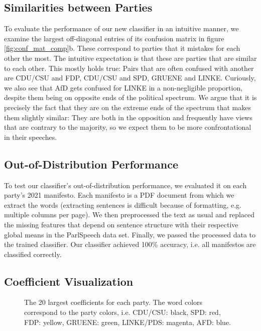 \documentclass{article}
\begin{document}
\subsection{Similarities between Parties}
To evaluate the performance of our new classifier in an intuitive manner, we examine the largest off-diagonal entries of its confusion matrix in figure \ref{fig:conf_mat_comp}b. These correspond to parties that it mistakes for each other the most. The intuitive expectation is that these are parties that are similar to each other. This mostly holds true: Pairs that are often confused with another are CDU/CSU and FDP, CDU/CSU and SPD, GRUENE and LINKE. Curiously, we also see that AfD gets confused for LINKE in a non-negligible proportion, despite them being on opposite ends of the political spectrum. We argue that it is precisely the fact that they are on the extreme ends of the spectrum that makes them slightly similar: They are both in the opposition and frequently have views that are contrary to the majority, so we expect them to be more confrontational in their speeches.

\subsection{Out-of-Distribution Performance}
To test our classifier's out-of-distribution performance, we evaluated it on each party's 2021 manifesto. Each manifesto is a PDF document from which we extract the words (extracting sentences is difficult because of formatting, e.g. multiple columns per page). We then preprocessed the text as usual and replaced the missing features that depend on sentence structure with their respective global means in the ParlSpeech data set. Finally, we passed the processed data to the trained classifier. Our classifier achieved 100\% accuracy, i.e. all manifestos are classified correctly.

\subsection{Coefficient Visualization}
\begin{figure}
  \caption{The 20 largest coefficients for each party. The word colors correspond to the party colors, i.e. CDU/CSU: black, SPD: red, FDP: yellow, GRUENE: green, LINKE/PDS: magenta, AFD: blue.}
  \label{fig:wordcloud}
\end{figure}
\end{document}
